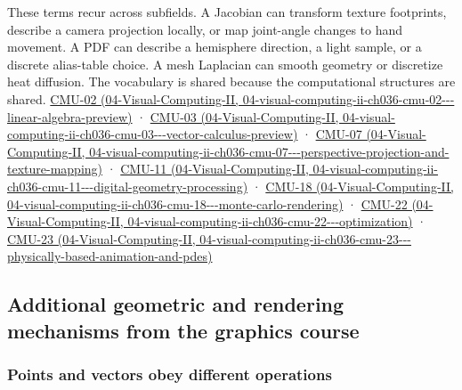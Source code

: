 These terms recur across subfields. A Jacobian can transform texture footprints, describe a camera projection locally, or map joint-angle changes to hand movement. A PDF can describe a hemisphere direction, a light sample, or a discrete alias-table choice. A mesh Laplacian can smooth geometry or discretize heat diffusion. The vocabulary is shared because the computational structures are shared. \href{../04-Visual-Computing-II/main.pdf\#nameddest=04-visual-computing-ii-ch036-cmu-02---linear-algebra-preview}{CMU-02 (04-Visual-Computing-II, 04-visual-computing-ii-ch036-cmu-02-\/-\/-linear-algebra-preview)} · \href{../04-Visual-Computing-II/main.pdf\#nameddest=04-visual-computing-ii-ch036-cmu-03---vector-calculus-preview}{CMU-03 (04-Visual-Computing-II, 04-visual-computing-ii-ch036-cmu-03-\/-\/-vector-calculus-preview)} · \href{../04-Visual-Computing-II/main.pdf\#nameddest=04-visual-computing-ii-ch036-cmu-07---perspective-projection-and-texture-mapping}{CMU-07 (04-Visual-Computing-II, 04-visual-computing-ii-ch036-cmu-07-\/-\/-perspective-projection-and-texture-mapping)} · \href{../04-Visual-Computing-II/main.pdf\#nameddest=04-visual-computing-ii-ch036-cmu-11---digital-geometry-processing}{CMU-11 (04-Visual-Computing-II, 04-visual-computing-ii-ch036-cmu-11-\/-\/-digital-geometry-processing)} · \href{../04-Visual-Computing-II/main.pdf\#nameddest=04-visual-computing-ii-ch036-cmu-18---monte-carlo-rendering}{CMU-18 (04-Visual-Computing-II, 04-visual-computing-ii-ch036-cmu-18-\/-\/-monte-carlo-rendering)} · \href{../04-Visual-Computing-II/main.pdf\#nameddest=04-visual-computing-ii-ch036-cmu-22---optimization}{CMU-22 (04-Visual-Computing-II, 04-visual-computing-ii-ch036-cmu-22-\/-\/-optimization)} · \href{../04-Visual-Computing-II/main.pdf\#nameddest=04-visual-computing-ii-ch036-cmu-23---physically-based-animation-and-pdes}{CMU-23 (04-Visual-Computing-II, 04-visual-computing-ii-ch036-cmu-23-\/-\/-physically-based-animation-and-pdes)}

\subsection{Additional geometric and rendering mechanisms from the graphics course}\label{03-visual-computing-i-ch001-additional-geometric-and-rendering-mechanisms-from-the-graphics-course}

\subsubsection{Points and vectors obey different operations}\label{03-visual-computing-i-ch001-points-and-vectors-obey-different-operations}

